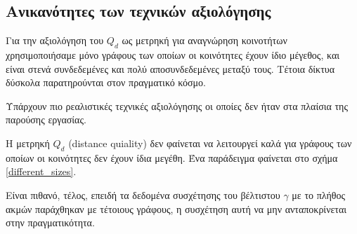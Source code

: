 \documentclass[10pt, letterpaper]{article}
\begin{document}
\subsection{Ανικανότητες των τεχνικών αξιολόγησης}

Για την αξιολόγηση του $Q_d$ ως μετρηκή για αναγνώρηση κοινοτήτων χρησιμοποιήσαμε 
μόνο γράφους των οποίων οι κοινότητες έχουν ίδιο μέγεθος, και 
είναι στενά συνδεδεμένες και πολύ αποσυνδεδεμένες μεταξύ τους. 
Τέτοια δίκτυα δύσκολα παρατηρούνται στον πραγματικό κόσμο. 

Υπάρχουν πιο ρεαλιστικές τεχνικές αξιολόγησης \cite{benchmark_realistic} οι οποίες δεν 
ήταν στα πλαίσια της παρούσης εργασίας. 


Η μετρηκή $Q_d$ (\textlatin{distance quiality}) δεν φαίνεται να λειτουργεί καλά για γράφους
των οποίων οι κοινότητες δεν έχουν ίδια μεγέθη. 
Ένα παράδειγμα φαίνεται στο σχήμα \ref{different_sizes}.  

Είναι πιθανό, τέλος, επειδή τα δεδομένα συσχέτησης του βέλτιστου $\gamma$ με το πλήθος 
ακμών παράχθηκαν με τέτοιους γράφους, η συσχέτηση αυτή να μην ανταποκρίνεται στην πραγματικότητα. 
\end{document}
